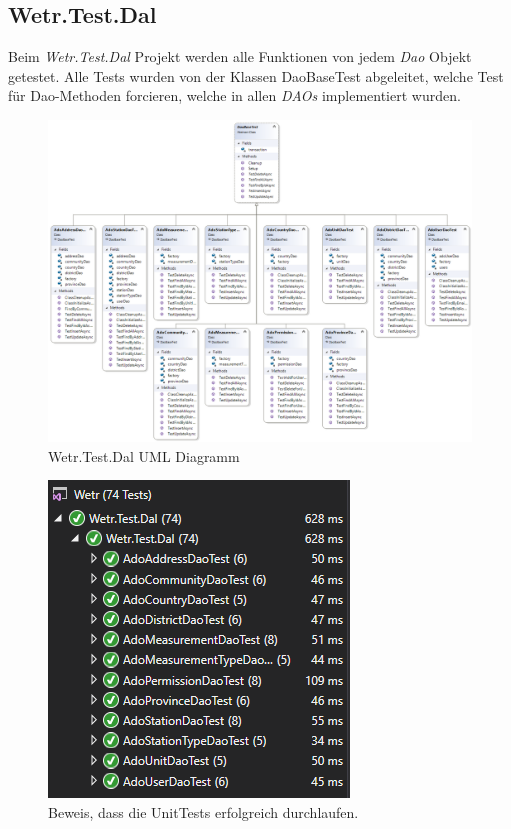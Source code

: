 \newpage
\subsection{Wetr.Test.Dal}
Beim \textit{Wetr.Test.Dal} Projekt werden alle Funktionen von jedem \textit{Dao} Objekt getestet. Alle Tests wurden von der Klassen DaoBaseTest abgeleitet, welche Test für Dao-Methoden forcieren, welche in allen \textit{DAOs} implementiert wurden. 

\begin{figure}[H]
\centering
\includegraphics[width=\textwidth]{pictures/Wetr_Test_Dal.png}
\caption{Wetr.Test.Dal UML Diagramm}
\label{fig:Wetr.Test.Dal}
\end{figure}
\raggedright

\begin{figure}[H]
\centering
\includegraphics[width=.4\textwidth]{pictures/green_tests.png}
\caption{Beweis, dass die UnitTests erfolgreich durchlaufen.}
\label{fig:Wetr.Test.Dal}
\end{figure}
\raggedright

